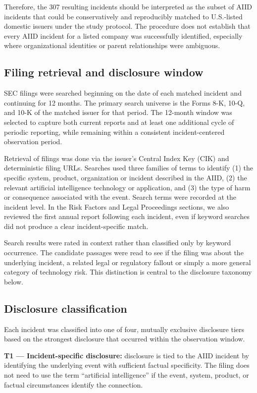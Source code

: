 \documentclass[utf8]{FrontiersinHarvard}
\begin{document}
Therefore, the 307 resulting incidents should be interpreted as the subset of AIID incidents that could be conservatively and reproducibly matched to U.S.-listed domestic issuers under the study protocol. The procedure does not establish that every AIID incident for a listed company was successfully identified, especially where organizational identities or parent relationships were ambiguous.

\subsection{Filing retrieval and disclosure window}
SEC filings were searched beginning on the date of each matched incident and continuing for 12 months. The primary search universe is the Forms 8-K, 10-Q, and 10-K of the matched issuer for that period. The 12-month window was selected to capture both current reports and at least one additional cycle of periodic reporting, while remaining within a consistent incident-centered observation period.

Retrieval of filings was done via the issuer's Central Index Key (CIK) and deterministic filing URLs. Searches used three families of terms to identify (1) the specific system, product, organization or incident described in the AIID, (2) the relevant artificial intelligence technology or application, and (3) the type of harm or consequence associated with the event. Search terms were recorded at the incident level. In the Risk Factors and Legal Proceedings sections, we also reviewed the first annual report following each incident, even if keyword searches did not produce a clear incident-specific match.

Search results were rated in context rather than classified only by keyword occurrence. The candidate passages were read to see if the filing was about the underlying incident, a related legal or regulatory fallout or simply a more general category of technology risk. This distinction is central to the disclosure taxonomy below.

\subsection{Disclosure classification}
Each incident was classified into one of four, mutually exclusive disclosure tiers based on the strongest disclosure that occurred within the observation window.

\textbf{T1 --- Incident-specific disclosure:} disclosure is tied to the AIID incident by identifying the underlying event with sufficient factual specificity. The filing does not need to use the term ``artificial intelligence'' if the event, system, product, or factual circumstances identify the connection.
\end{document}
